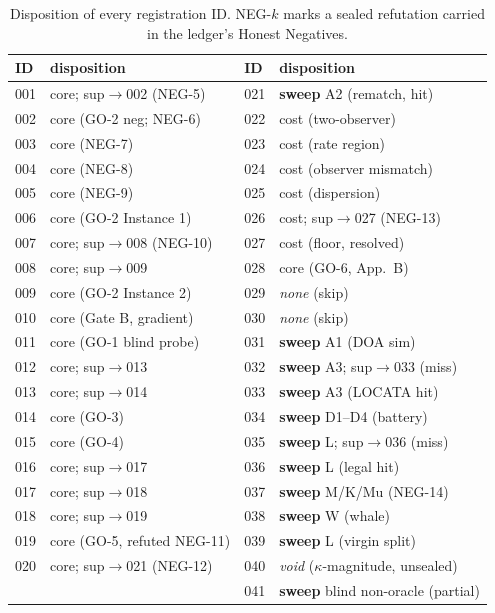 \documentclass[10pt]{article} %
\theoremstyle{remark}
\newcommand{\kalign}{\kappa}
\begin{document}
\begin{table}[h]\footnotesize\centering
\caption{Disposition of every registration ID. NEG-$k$ marks a sealed refutation carried in
the ledger's Honest Negatives.}
\label{tab:registry}
\begin{tabular}{@{}llll@{}}
\toprule
ID & disposition & ID & disposition \\
\midrule
001 & core; sup$\to$002 (NEG-5) & 021 & \textbf{sweep} A2 (rematch, hit) \\
002 & core (GO-2 neg; NEG-6)     & 022 & cost (two-observer) \\
003 & core (NEG-7)               & 023 & cost (rate region) \\
004 & core (NEG-8)               & 024 & cost (observer mismatch) \\
005 & core (NEG-9)               & 025 & cost (dispersion) \\
006 & core (GO-2 Instance 1)     & 026 & cost; sup$\to$027 (NEG-13) \\
007 & core; sup$\to$008 (NEG-10) & 027 & cost (floor, resolved) \\
008 & core; sup$\to$009          & 028 & core (GO-6, App.\ B) \\
009 & core (GO-2 Instance 2)     & 029 & \emph{none} (skip) \\
010 & core (Gate B, gradient)    & 030 & \emph{none} (skip) \\
011 & core (GO-1 blind probe)    & 031 & \textbf{sweep} A1 (DOA sim) \\
012 & core; sup$\to$013          & 032 & \textbf{sweep} A3; sup$\to$033 (miss) \\
013 & core; sup$\to$014          & 033 & \textbf{sweep} A3 (LOCATA hit) \\
014 & core (GO-3)                & 034 & \textbf{sweep} D1--D4 (battery) \\
015 & core (GO-4)               & 035 & \textbf{sweep} L; sup$\to$036 (miss) \\
016 & core; sup$\to$017          & 036 & \textbf{sweep} L (legal hit) \\
017 & core; sup$\to$018          & 037 & \textbf{sweep} M/K/Mu (NEG-14) \\
018 & core; sup$\to$019          & 038 & \textbf{sweep} W (whale) \\
019 & core (GO-5, refuted NEG-11)& 039 & \textbf{sweep} L (virgin split) \\
020 & core; sup$\to$021 (NEG-12) & 040 & \emph{void} ($\kalign$-magnitude, unsealed) \\
    &                            & 041 & \textbf{sweep} blind non-oracle (partial) \\
\bottomrule
\end{tabular}
\end{table}
\end{document}
